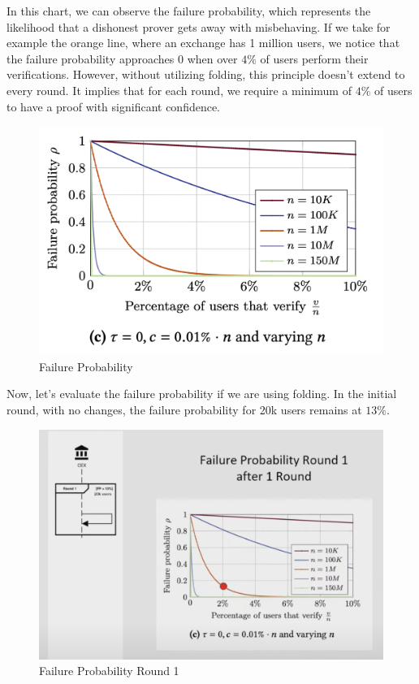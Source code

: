 In this chart, we can observe the failure probability, which represents the likelihood that a dishonest prover gets away with misbehaving.
If we take for example the orange line, where an exchange has 1 million users, we notice that the failure probability approaches 0 when over $4\%$ of users perform their verifications.
However, without utilizing folding, this principle doesn't extend to every round. It implies that for each round, we require a minimum of $4\%$ of users to have a proof with significant confidence.

\begin{figure}[H]
   \centering
   \includegraphics[width=130mm]{FailureProbability.png}
   \caption{Failure Probability \cite{GP21}}
   \label{overflow}
   \end{figure}

Now, let's evaluate the failure probability if we are using folding.
In the initial round, with no changes, the failure probability for 20k users remains at $13\%$.

\begin{figure}[H]
   \centering
   \includegraphics[width=130mm]{FailureProbabilityRound1.png}
   \caption{Failure Probability Round 1 \cite{NS23}}
   \label{overflow}
   \end{figure}

